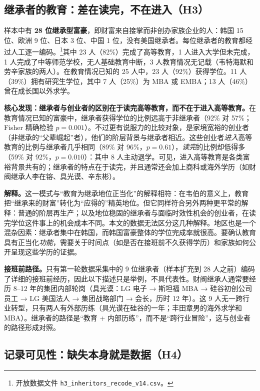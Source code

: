 \documentclass[UTF8,a4paper,11pt]{ctexart}
\begin{document}
\subsection{继承者的教育：差在读完，不在进入（H3）}

样本中有 \textbf{28 位继承型富豪}，即财富来自接掌而非创办家族企业的人：韩国 15 位、欧洲 9 位、日本 3 位、中国 1 位，没有美国继承者。每位继承者的教育都经过人工逐一编码。\footnote{开放数据文件 \texttt{h3\_inheritors\_recode\_v14.csv}。}其中 23 人（82\%）完成了高等教育，1 人进入大学但未完成，1 人完成了中等师范学校，无人基础教育中断，3 人教育情况无记载（韦特海默和劳辛家族的两人）。在教育情况已知的 25 人中，23 人（92\%）获得学位。11 人（39\%）拥有研究生学位，其中 7 人（25\%）为 MBA 或 EMBA；13 人（46\%）曾在成长国以外求学。

\textbf{核心发现：继承者与创业者的区别在于读完高等教育，而不在于进入高等教育。}在教育情况已知的富豪中，继承者获得学位的比例远高于非继承者（92\% 对 57\%；Fisher 精确检验 $p=0.001$）。不过更有说服力的比较对象，是家境宽裕的创业者（非继承的“父辈崛起”者），他们的阶层背景与继承者相近。这些创业者\emph{进入}高等教育的比例与继承者几乎相同（89\% 对 96\%，$p=0.61$），\emph{读完}的比例却低得多（59\% 对 92\%，$p=0.010$）：其中 8 人主动退学。可见，进入高等教育是各类富裕背景共有的；继承者的特点在于读完，并且通常还会加上商科或海外学历（如财阀继承人李在镕、具光谟、辛东彬）。

\textbf{解释。}这一模式与“教育为继承地位正当化”的解释相符：在韦伯的意义上，教育把“继承来的财富”转化为“应得的”精英地位。但它同样符合另外两种更平常的解释：普通的阶层再生产；以及地位稳固的继承者与面临时效性机会的创业者，在读完学位这件事上的机会成本不同。本文的数据无法区分这几种解释。地区也是一个混杂因素：继承者集中在韩国，而韩国富豪整体的学位完成率就很高。要确认教育具有正当化\emph{功能}，需要关于时间点（如是否在接班前不久获得学历）和家族如何公开呈现这些学历的证据。

\textbf{接班前路径。}只有第一轮数据采集中的 9 位继承者（样本扩充到 28 人之前）编码了详细的接班前经历，因此以下描述只是举例，不具代表性。财阀继承人通常要经历 8--12 年的集团内部轮岗（具光谟：LG 电子 → 斯坦福 MBA → 硅谷初创公司员工 → LG 美国法人 → 集团战略部门 → 会长，历时 12 年）。这 9 人无一跨行业转型，只有两人有外部历练（具光谟在硅谷的一年；丰田章男的海外求学和 MBA）。继承者的路径是“教育 + 内部历练”，而不是“跨行业冒险”，这与创业者的路径形成对照。

\subsection{记录可见性：缺失本身就是数据（H4）}
\end{document}
